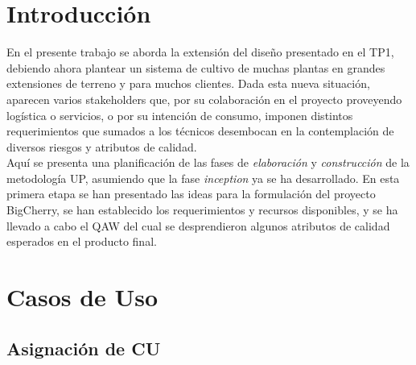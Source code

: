 \section{Introducción}

En el presente trabajo se aborda la extensión del diseño presentado en el TP1, debiendo ahora plantear un sistema de cultivo de muchas plantas en grandes extensiones de terreno y para muchos clientes. Dada esta nueva situación, aparecen varios stakeholders que, por su colaboración en el proyecto proveyendo logística o servicios, o por su intención de consumo, imponen distintos requerimientos que sumados a los técnicos desembocan en la contemplación de diversos riesgos y atributos de calidad.\\
Aquí se presenta una planificación de las fases de \textit{elaboración} y \textit{construcción} de la metodología UP, asumiendo que la fase \textit{inception} ya se ha desarrollado. En esta primera etapa se han presentado las ideas para la formulación del proyecto BigCherry, se han establecido los requerimientos y recursos disponibles, y se ha llevado a cabo el QAW del cual se desprendieron algunos atributos de calidad esperados en el producto final.\\

\section{Casos de Uso}

\subsection{Asignación de CU}

